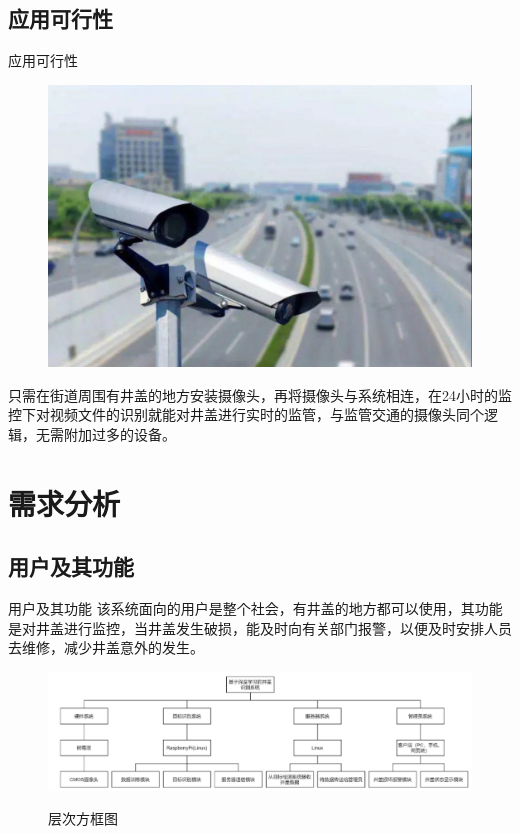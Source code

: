 \documentclass{beamer}
\begin{document}
\subsection{应用可行性}
\begin{frame}{应用可行性}
    \begin{minipage}{0.3\linewidth}
        \medskip
        \begin{figure}[h]
            \centering
            \includegraphics[height=.4\textheight]{jk.jpeg}
        \end{figure}
    \end{minipage}\hspace{2cm}
    \begin{minipage}[c]{0.5\linewidth}
只需在街道周围有井盖的地方安装摄像头，再将摄像头与系统相连，在24小时的监控下对视频文件的识别就能对井盖进行实时的监管，与监管交通的摄像头同个逻辑，无需附加过多的设备。
\end{minipage}
\end{frame}


\section{需求分析}
\subsection{用户及其功能}
\begin{frame}{用户及其功能}
该系统面向的用户是整个社会，有井盖的地方都可以使用，其功能是对井盖进行监控，当井盖发生破损，能及时向有关部门报警，以便及时安排人员去维修，减少井盖意外的发生。

 \begin{figure}[h]
            \centering
            \includegraphics[height=.3\textheight]{szt.png}
            \label{层次方框图}
             \caption{层次方框图}
        \end{figure}
\end{frame}
\end{document}
